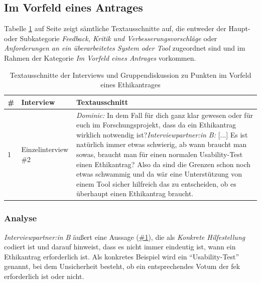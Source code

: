 \documentclass[a4paper,12pt,twoside]{scrreprt}
\begin{document}
\subsection{Im Vorfeld eines Antrages}
\label{sub-sec:vorfeld-antrag}

Tabelle \ref{tab:anforderungen-vorfeld-antrag} auf Seite \pageref{tab:anforderungen-vorfeld-antrag} zeigt sämtliche Textausschnitte auf, die entweder der Haupt- oder Subkategorie \textit{Feedback, Kritik und Verbesserungsvorschläge} oder \textit{Anforderungen an ein überarbeitetes System oder Tool} zugeordnet sind und im Rahmen der Kategorie \textit{Im Vorfeld eines Antrages} vorkommen.

\begin{table}[ht]
    \centering
    \begin{tabular}{p{.05\linewidth} | p{.2\linewidth} | p{.65\linewidth}}
        \# & \textbf{Interview} & \textbf{Textausschnitt}\\
        \hline
        1 & Einzelinterview \#2 & \textit{Dominic:} In dem Fall für dich ganz klar gewesen oder für euch im Forschungsprojekt, dass da ein Ethikantrag wirklich notwendig ist?\newline \textit{Interviewpartner:in B:} [...] Es ist natürlich immer etwas schwierig, ab wann braucht man sowas, braucht man für einen normalen Usability-Test einen Ethikantrag? Also da sind die Grenzen schon noch etwas schwammig und da wär eine Unterstützung von einem Tool sicher hilfreich das zu entscheiden, ob es überhaupt einen Ethikantrag braucht.
    \end{tabular}
    \caption{Textausschnitte der Interviews und Gruppendiskussion zu Punkten im Vorfeld eines Ethikantrages}
    \label{tab:anforderungen-vorfeld-antrag}
\end{table}

\subsubsection*{Analyse}
\label{sub-sub-sec:analyse-vorfeld-antrag}

\textit{Interviewpartner:in B} äußert eine Aussage (\hyperref[tab:anforderungen-vorfeld-antrag]{\#1}), die als \textit{Konkrete Hilfestellung} codiert ist und darauf hinweist, dass es nicht immer eindeutig ist, wann ein Ethikantrag erforderlich ist. Als konkretes Beispiel wird ein \enquote{Usability-Test} genannt, bei dem Unsicherheit besteht, ob ein entsprechendes Votum der \ac{fek} erforderlich ist oder nicht.
\end{document}
